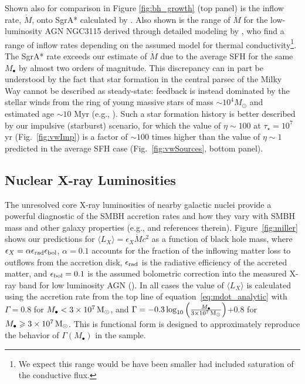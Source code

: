 \documentclass[usenatbib,fleqn]{mn2e}
\newcommand{\Mbh}[1][]{M_{\bullet#1}}
\begin{document}
Shown also for comparison in Figure \ref{fig:bh_growth} (top panel) is
the inflow rate, $\dot{M}$, onto SgrA* calculated by
\citet{Quataert:2004a}.  Also shown is the range of $\dot{M}$ for the
low-luminosity AGN NGC3115 derived through detailed modeling by
\citet{ShcherbakovWong+:2014a}, who find a range of inflow rates
depending on the assumed model for thermal conductivity\footnote{We
  expect this range would be have been smaller had
  \citet{ShcherbakovWong+:2014a} included saturation of the conductive
  flux.}.  The SgrA* rate exceeds our estimate of $\dot{M}$ due to the
average SFH for the same $M_{\bullet}$ by almost two orders of
magnitude.  This discrepancy can in part be understood by the fact
that star formation in the central parsec of the Milky Way cannot be
described as steady-state: feedback is instead dominated by the
stellar winds from the ring of young massive stars of mass $\sim
10^{4}M_{\odot}$ and estimated age $\sim 10$ Myr (e.g.,
\citealt{Schodel+07}).  Such a star formation history is better
described by our impulsive (starburst) scenario, for which the value
of $\eta \sim 100$ at $\tau_{\star} = 10^{7}$ yr
(Fig.~\ref{fig:vwImp}) is a factor of $\sim 100$ times higher than the
value of $\eta \sim 1$ predicted in the average SFH case
(Fig.~\ref{fig:vwSources}, bottom panel).


\subsection{Nuclear X-ray Luminosities}
\label{sec:Lx}

The unresolved core X-ray luminosities of nearby galactic nuclei
provide a powerful diagnostic of the SMBH accretion rates and how they
vary with SMBH mass and other galaxy properties (e.g., \citealt{Ho08}
and references therein).  Figure~\ref{fig:miller} shows our
predictions for $\langle L_{X} \rangle =\epsilon_X \dot{M} c^2$ as a
function of black hole mass, where $\epsilon_{X} = \alpha\epsilon_{\rm
  rad}\epsilon_{\rm bol}$, $\alpha = 0.1$ accounts for the fraction of
the inflowing matter loss to outflows from the accretion disk,
$\epsilon_{\rm rad}$ is the radiative efficiency of the accreted
matter, and $\epsilon_{\rm bol} = 0.1$ is the assumed bolometric
correction into the measured X-ray band for low luminosity AGN
(\citealt{Ho08}).  In all cases the value of $\langle L_X \rangle$ is
calculated using the accretion rate from the top line of
equation~\eqref{eq:mdot_analytic} with $\Gamma = 0.8$ for $\Mbh < 3
\times 10^7 \Msun$, and $\Gamma=-0.3 \log_{10}
\left(\frac{\Mbh}{3\times 10^7 \Msun}\right)$+0.8 for $\Mbh \geq 3
\times 10^7 \Msun$. This is functional form is designed to
approximately reproduce the behavior of $\Gamma(\Mbh)$ in the
\citet{LauerFaber+:2007a} sample.
\end{document}
